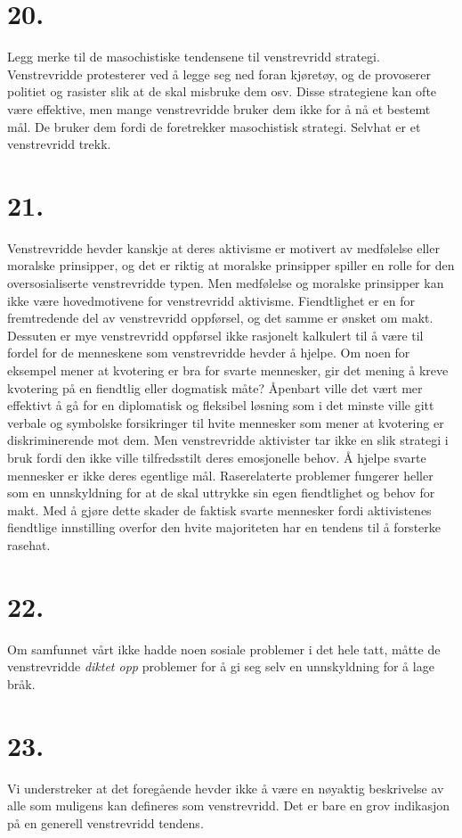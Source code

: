 \documentclass[oneside]{book}
\begin{document}
\section*{20.}
Legg merke til de masochistiske tendensene til venstrevridd strategi.
Venstrevridde protesterer ved å legge seg ned foran kjøretøy, og de provoserer
politiet og rasister slik at de skal misbruke dem osv. Disse strategiene kan
ofte være effektive, men mange venstrevridde bruker dem ikke for å nå et
bestemt mål. De bruker dem fordi de foretrekker masochistisk strategi. Selvhat
er et venstrevridd trekk.

\section*{21.}
Venstrevridde hevder kanskje at deres aktivisme er motivert av medfølelse eller
moralske prinsipper, og det er riktig at moralske prinsipper spiller en rolle
for den oversosialiserte venstrevridde typen. Men medfølelse og moralske
prinsipper kan ikke være hovedmotivene for venstrevridd aktivisme. Fiendtlighet
er en for fremtredende del av venstrevridd oppførsel, og det samme er ønsket om
makt. Dessuten er mye venstrevridd oppførsel ikke rasjonelt kalkulert til å
være til fordel for de menneskene som venstrevridde hevder å hjelpe. Om noen
for eksempel mener at kvotering er bra for svarte mennesker, gir det mening å
kreve kvotering på en fiendtlig eller dogmatisk måte? Åpenbart ville det vært
mer effektivt å gå for en diplomatisk og fleksibel løsning som i det minste
ville gitt verbale og symbolske forsikringer til hvite mennesker som mener at
kvotering er diskriminerende mot dem. Men venstrevridde aktivister tar ikke en
slik strategi i bruk fordi den ikke ville tilfredsstilt deres emosjonelle
behov. Å hjelpe svarte mennesker er ikke deres egentlige mål. Raserelaterte
problemer fungerer heller som en unnskyldning for at de skal uttrykke sin egen
fiendtlighet og behov for makt. Med å gjøre dette skader de faktisk svarte
mennesker fordi aktivistenes fiendtlige innstilling overfor den hvite
majoriteten har en tendens til å forsterke rasehat.

\section*{22.}
Om samfunnet vårt ikke hadde noen sosiale problemer i det hele tatt, måtte de
venstrevridde \emph{diktet opp} problemer for å gi seg selv en unnskyldning for
å lage bråk.

\section*{23.}
Vi understreker at det foregående hevder ikke å være en nøyaktig beskrivelse av
alle som muligens kan defineres som venstrevridd. Det er bare en grov
indikasjon på en generell venstrevridd tendens.
\end{document}
